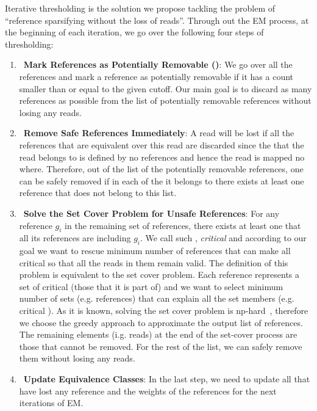 Iterative thresholding is the solution we propose tackling the problem of
``reference sparsifying without the loss of reads''.
Through out the EM process, at the beginning of each iteration,
we go over the following four steps of thresholding:
\begin{enumerate}
    \item~\textbf{Mark References as Potentially Removable (\abpt)}:
    We go over all the references and mark a reference as potentially removable
    if it has a count smaller than or equal to the given cutoff.
    Our main goal is to discard as many references as possible
    from the list of potentially removable references without losing any reads.
    \item~\textbf{Remove Safe \abpt References Immediately}:
    A read will be lost if all the references that are equivalent over this read are discarded
    since the \eq that the read belongs to is defined by no references
    and hence the read is mapped no where.
    Therefore, out of the list of the potentially removable references,
    one can be safely removed if in each of the \eqs it belongs to there exists at least one reference
    that does not belong to this list.
    \item~\textbf{Solve the Set Cover Problem for Unsafe \abpt References}:
    For any reference $g_i$ in the remaining set of \abpt references,
    there exists at least one \eq that all its references are \abpt including $g_i$.
    We call such \eqs, \textit{critical \eqs} and according to our goal
    we want to rescue minimum number of \abpt references that can make all critical \eqs
    so that all the reads in them remain valid.
    The definition of this problem is equivalent to the set cover problem.
    Each reference represents a set of critical \eqs (those that it is part of)
    and we want to select minimum number of sets (e.g. references)
    that can explain all the set members (e.g. critical \eqs).
    As it is known, solving the set cover problem is np-hard~\cite{},
    therefore we choose the greedy approach to approximate the output list of references.
    The remaining elements (i.g. reads) at the end of the set-cover process are those that cannot be removed.
    For the rest of the list, we can safely remove them without losing any reads.
    \item~\textbf{Update Equivalence Classes}:
    In the last step, we need to update all \eqs that have lost any reference
    and the weights of the references for the next iterations of EM.
\end{enumerate}



